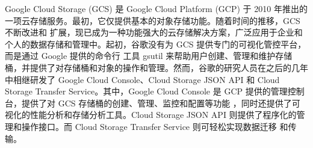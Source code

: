 


Google Cloud Storage (GCS) 是 Google Cloud Platform (GCP) 于 2010 年推出的一项云存储服务\cite{kongqinong2015keji}。最初，它仅提供基本的对象存储功能。随着时间的推移，GCS 不断改进和
扩展，现已成为一种功能强大的云存储解决方案，广泛应用于企业和个人的数据存储和管理中。起初，谷歌没有为 GCS 提供专门的可视化管控平台，而是通过 Google 提供的命令行
工具 gsutil 来帮助用户创建、管理和维护存储桶，并提供了对存储桶和对象的操作和管理。然而，谷歌的研究人员在之后的几年中相继研发了 Google Cloud Console、Cloud 
Storage JSON API 和 Cloud Storage Transfer Service。其中，Google Cloud Console 是 GCP 提供的管理控制台\cite{kong2015keji}，提供了对 GCS 存储桶的创建、管理、监控和配置等功能
，同时还提供了可视化的性能分析和存储分析工具。Cloud Storage JSON API 则提供了程序化的管理和操作接口。而 Cloud Storage Transfer Service 则可轻松实现数据迁移
和传输。

